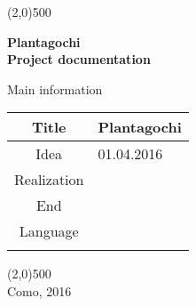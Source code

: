 \documentclass[a4paper,12pt]{article} %
\begin{document}
\begin{titlepage}

\line(2,0){500}

\vspace{30pt}

\begin{center}
{\Huge \textbf{Plantagochi}}\\
\vspace{40pt}
{\huge \textbf{Project documentation}}\\
\end{center}

\vspace{70pt}
		
\begin{center}
{\large Main information}\\
\end{center}

\begin{tabularx}{\textwidth}{|c|X|}
\hline
Title & Plantagochi\\
\hline
Idea & 01.04.2016\\
\hline
Realization & \\
\hline
End & \\
\hline
Language & \\
\hline
 & \\
\hline
\end{tabularx}

		
\vspace{\fill}
\begin{center}
\line(2,0){500}\\
Como, 2016
\end{center}

\end{titlepage}
\end{document}
